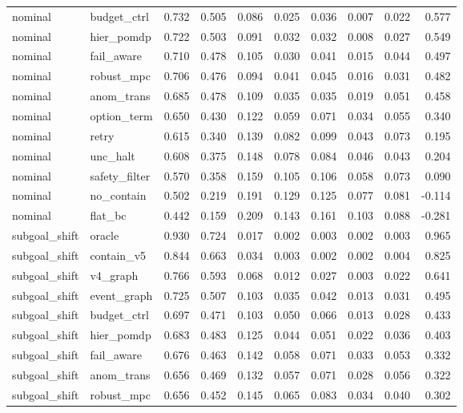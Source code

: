 \documentclass{article}
\begin{document}
\begin{longtable}{@{}llrrrrrrrr@{}}
nominal & budget\_ctrl & 0.732 & 0.505 & 0.086 & 0.025 & 0.036 & 0.007 & 0.022 & 0.577 \\
nominal & hier\_pomdp & 0.722 & 0.503 & 0.091 & 0.032 & 0.032 & 0.008 & 0.027 & 0.549 \\
nominal & fail\_aware & 0.710 & 0.478 & 0.105 & 0.030 & 0.041 & 0.015 & 0.044 & 0.497 \\
nominal & robust\_mpc & 0.706 & 0.476 & 0.094 & 0.041 & 0.045 & 0.016 & 0.031 & 0.482 \\
nominal & anom\_trans & 0.685 & 0.478 & 0.109 & 0.035 & 0.035 & 0.019 & 0.051 & 0.458 \\
nominal & option\_term & 0.650 & 0.430 & 0.122 & 0.059 & 0.071 & 0.034 & 0.055 & 0.340 \\
nominal & retry & 0.615 & 0.340 & 0.139 & 0.082 & 0.099 & 0.043 & 0.073 & 0.195 \\
nominal & unc\_halt & 0.608 & 0.375 & 0.148 & 0.078 & 0.084 & 0.046 & 0.043 & 0.204 \\
nominal & safety\_filter & 0.570 & 0.358 & 0.159 & 0.105 & 0.106 & 0.058 & 0.073 & 0.090 \\
nominal & no\_contain & 0.502 & 0.219 & 0.191 & 0.129 & 0.125 & 0.077 & 0.081 & -0.114 \\
nominal & flat\_bc & 0.442 & 0.159 & 0.209 & 0.143 & 0.161 & 0.103 & 0.088 & -0.281 \\
subgoal\_shift & oracle & 0.930 & 0.724 & 0.017 & 0.002 & 0.003 & 0.002 & 0.003 & 0.965 \\
subgoal\_shift & contain\_v5 & 0.844 & 0.663 & 0.034 & 0.003 & 0.002 & 0.002 & 0.004 & 0.825 \\
subgoal\_shift & v4\_graph & 0.766 & 0.593 & 0.068 & 0.012 & 0.027 & 0.003 & 0.022 & 0.641 \\
subgoal\_shift & event\_graph & 0.725 & 0.507 & 0.103 & 0.035 & 0.042 & 0.013 & 0.031 & 0.495 \\
subgoal\_shift & budget\_ctrl & 0.697 & 0.471 & 0.103 & 0.050 & 0.066 & 0.013 & 0.028 & 0.433 \\
subgoal\_shift & hier\_pomdp & 0.683 & 0.483 & 0.125 & 0.044 & 0.051 & 0.022 & 0.036 & 0.403 \\
subgoal\_shift & fail\_aware & 0.676 & 0.463 & 0.142 & 0.058 & 0.071 & 0.033 & 0.053 & 0.332 \\
subgoal\_shift & anom\_trans & 0.656 & 0.469 & 0.132 & 0.057 & 0.071 & 0.028 & 0.056 & 0.322 \\
subgoal\_shift & robust\_mpc & 0.656 & 0.452 & 0.145 & 0.065 & 0.083 & 0.034 & 0.040 & 0.302 \\

\end{longtable}
\end{document}
